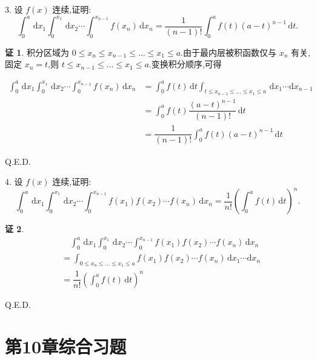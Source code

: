 \documentclass[a4paper,12pt]{article}
\theoremstyle{definition}
\newtheorem*{pf}{证}
\begin{document}
3. 设 $f(x)$ 连续,证明:
$$\int_{0}^{a}\,\mathrm{d}x_1 \int_{0}^{x_1}\,\mathrm{d}x_2 \cdots \int_{0}^{x_{n-1}} f(x_n) \, \mathrm{d}x_n = \frac{1}{(n-1)!} \int_{0}^{a} f(t)(a - t)^{n-1} \, \mathrm{d}t.$$
\begin{pf}
    积分区域为 $0\leq x_n\leq x_{n-1}\leq\dots\leq x_1\leq a$.由于最内层被积函数仅与 $x_n$ 有关,固定 $x_n=t$,则 $t\leq x_{n-1}\leq\dots\leq x_1\leq a$.变换积分顺序,可得

    \begin{align*}
        \int_{0}^{a}\,\mathrm{d}x_1 \int_{0}^{x_1}\,\mathrm{d}x_2 \cdots \int_{0}^{x_{n-1}} f(x_n) \, \mathrm{d}x_n
         & =\int_0^a f(t)\,\mathrm{d}t\int_{t\leq x_{n-1}\leq\dots\leq x_1\leq a}\,\mathrm{d}x_1\cdots\mathrm{d}x_{n-1} \\
         & =\int_0^a f(t)\dfrac{(a-t)^{n-1}}{(n-1)!}\,\mathrm{d}t                                                        \\
         & =\dfrac{1}{(n-1)!} \int_{0}^{a} f(t)(a - t)^{n-1} \, \mathrm{d}t
    \end{align*}

    Q.E.D.
\end{pf}

4. 设 $f(x)$ 连续,证明:
$$\int_{0}^{a}\,\mathrm{d}x_1 \int_{0}^{x_1}\,\mathrm{d}x_2 \cdots \int_{0}^{x_{n-1}} f(x_1)f(x_2) \cdots f(x_n) \, \mathrm{d}x_n = \frac{1}{n!} \left( \int_{0}^{a} f(t) \, \mathrm{d}t \right)^n.$$
\begin{pf}
    \begin{align*}
         & \quad\int_{0}^{a}\,\mathrm{d}x_1 \int_{0}^{x_1}\,\mathrm{d}x_2 \cdots \int_{0}^{x_{n-1}} f(x_1)f(x_2) \cdots f(x_n) \, \mathrm{d}x_n \\
         & =\int_{0\leq x_n\leq\dots\leq x_1\leq a}f(x_1)f(x_2) \cdots f(x_n)\,\mathrm{d}x_1\cdots\mathrm{d}x_n                                 \\
         & =\dfrac{1}{n!} \left( \int_{0}^{a} f(t) \, \mathrm{d}t \right)^n
    \end{align*}

    Q.E.D.
\end{pf}

\section*{第10章综合习题}
\end{document}
